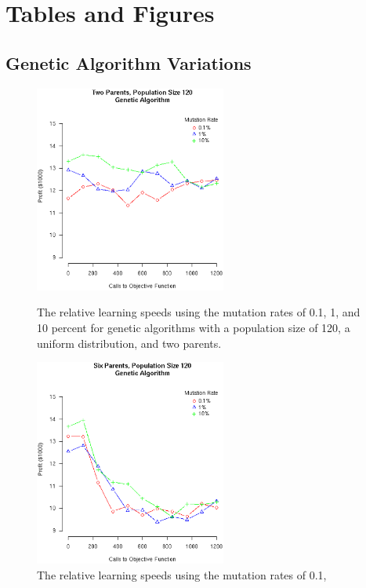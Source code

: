 \documentclass[12pt]{article}
\begin{document}
\pagebreak
\section{Tables and Figures}
\vspace{-16pt}
\subsection{Genetic Algorithm Variations}

\begin{figure}[!ht]
  \begin{minipage}[b]{0.5\linewidth}
    \center
    \includegraphics[width=6.3cm]{Gen2ParentsPop120.eps}
    \caption{The relative learning speeds using the mutation rates of 0.1,
      1, and 10 percent for genetic algorithms with a population size of 120, a
      uniform distribution, and two parents.}
  \end{minipage}
\hspace{0.5cm} %
  \begin{minipage}[b]{0.5\linewidth}
    \center
    \includegraphics[width=6.3cm]{Gen6ParentsPop120.eps}
    \caption{The relative learning speeds using the mutation rates of 0.1,
}
\end{minipage}
\end{figure}
\end{document}
